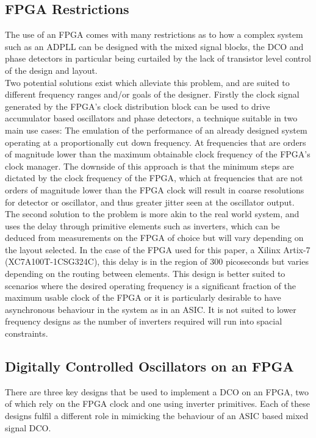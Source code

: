 \documentclass[conference]{IEEEtran}
\begin{document}
{\subsection{FPGA Restrictions}
The use of an FPGA comes with many restrictions as to how a complex system such as an ADPLL can be designed with the mixed signal blocks, the DCO and phase detectors in particular being curtailed by the lack of transistor level control of the design and layout.\\
Two potential solutions exist which alleviate this problem, and are suited to different frequency ranges and/or goals of the designer. Firstly the clock signal generated by the FPGA's clock distribution block can be used to drive accumulator based oscillators and phase detectors, a technique suitable in two main use cases: The emulation of the performance of an already designed system operating at a proportionally cut down frequency. At frequencies that are orders of magnitude lower than the maximum obtainable clock frequency of the FPGA's clock manager.
The downside of this approach is that the minimum steps are dictated by the clock frequency of the FPGA, which at frequencies that are not orders of magnitude lower than the FPGA clock will result in coarse resolutions for detector or oscillator, and thus greater jitter seen at the oscillator output.\\
The second solution to the problem is more akin to the real world system, and uses the delay through primitive elements such as inverters, which can be deduced from measurements on the FPGA of choice but will vary depending on the layout selected. In the case of the FPGA used for this paper, a Xilinx Artix-7 (XC7A100T-1CSG324C), this delay is in the region of 300 picoseconds but varies depending on the routing between elements. This design is better suited to scenarios where the desired operating frequency is a significant fraction of the maximum usable clock of the FPGA or it is particularly desirable to have asynchronous behaviour in the system as in an ASIC. It is not suited to lower frequency designs as the number of inverters required will run into spacial constraints.
\subsection{Digitally Controlled Oscillators on an FPGA}
There are three key designs that be used to implement a DCO on an FPGA, two of which rely on the FPGA clock and one using inverter primitives. Each of these designs fulfil a different role in mimicking the behaviour of an ASIC based mixed signal DCO.

}
\end{document}
